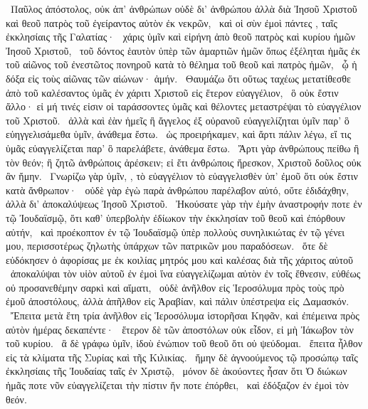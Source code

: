 ~Παῦλος ἀπόστολος, οὐκ ἀπ’ ἀνθρώπων οὐδὲ δι’ ἀνθρώπου ἀλλὰ διὰ Ἰησοῦ Χριστοῦ καὶ θεοῦ πατρὸς τοῦ ἐγείραντος αὐτὸν ἐκ νεκρῶν,
~καὶ οἱ σὺν ἐμοὶ πάντες , ταῖς ἐκκλησίαις τῆς Γαλατίας·
~χάρις ὑμῖν καὶ εἰρήνη ἀπὸ θεοῦ πατρὸς καὶ κυρίου ἡμῶν Ἰησοῦ Χριστοῦ,
~τοῦ δόντος ἑαυτὸν ὑπὲρ τῶν ἁμαρτιῶν ἡμῶν ὅπως ἐξέληται ἡμᾶς ἐκ τοῦ αἰῶνος τοῦ ἐνεστῶτος πονηροῦ κατὰ τὸ θέλημα τοῦ θεοῦ καὶ πατρὸς ἡμῶν,
~ᾧ ἡ δόξα εἰς τοὺς αἰῶνας τῶν αἰώνων· ἀμήν.
~Θαυμάζω ὅτι οὕτως ταχέως μετατίθεσθε ἀπὸ τοῦ καλέσαντος ὑμᾶς ἐν χάριτι Χριστοῦ εἰς ἕτερον εὐαγγέλιον,
~ὃ οὐκ ἔστιν ἄλλο· εἰ μή τινές εἰσιν οἱ ταράσσοντες ὑμᾶς καὶ θέλοντες μεταστρέψαι τὸ εὐαγγέλιον τοῦ Χριστοῦ.
~ἀλλὰ καὶ ἐὰν ἡμεῖς ἢ ἄγγελος ἐξ οὐρανοῦ εὐαγγελίζηται ὑμῖν παρ’ ὃ εὐηγγελισάμεθα ὑμῖν, ἀνάθεμα ἔστω.
~ὡς προειρήκαμεν, καὶ ἄρτι πάλιν λέγω, εἴ τις ὑμᾶς εὐαγγελίζεται παρ’ ὃ παρελάβετε, ἀνάθεμα ἔστω.
~Ἄρτι γὰρ ἀνθρώπους πείθω ἢ τὸν θεόν; ἢ ζητῶ ἀνθρώποις ἀρέσκειν; εἰ ἔτι ἀνθρώποις ἤρεσκον, Χριστοῦ δοῦλος οὐκ ἂν ἤμην.
~Γνωρίζω γὰρ ὑμῖν, , τὸ εὐαγγέλιον τὸ εὐαγγελισθὲν ὑπ’ ἐμοῦ ὅτι οὐκ ἔστιν κατὰ ἄνθρωπον·
~οὐδὲ γὰρ ἐγὼ παρὰ ἀνθρώπου παρέλαβον αὐτό, οὔτε ἐδιδάχθην, ἀλλὰ δι’ ἀποκαλύψεως Ἰησοῦ Χριστοῦ.
~Ἠκούσατε γὰρ τὴν ἐμὴν ἀναστροφήν ποτε ἐν τῷ Ἰουδαϊσμῷ, ὅτι καθ’ ὑπερβολὴν ἐδίωκον τὴν ἐκκλησίαν τοῦ θεοῦ καὶ ἐπόρθουν αὐτήν,
~καὶ προέκοπτον ἐν τῷ Ἰουδαϊσμῷ ὑπὲρ πολλοὺς συνηλικιώτας ἐν τῷ γένει μου, περισσοτέρως ζηλωτὴς ὑπάρχων τῶν πατρικῶν μου παραδόσεων.
~ὅτε δὲ εὐδόκησεν ὁ ἀφορίσας με ἐκ κοιλίας μητρός μου καὶ καλέσας διὰ τῆς χάριτος αὐτοῦ
~ἀποκαλύψαι τὸν υἱὸν αὐτοῦ ἐν ἐμοὶ ἵνα εὐαγγελίζωμαι αὐτὸν ἐν τοῖς ἔθνεσιν, εὐθέως οὐ προσανεθέμην σαρκὶ καὶ αἵματι,
~οὐδὲ ἀνῆλθον εἰς Ἱεροσόλυμα πρὸς τοὺς πρὸ ἐμοῦ ἀποστόλους, ἀλλὰ ἀπῆλθον εἰς Ἀραβίαν, καὶ πάλιν ὑπέστρεψα εἰς Δαμασκόν.
~Ἔπειτα μετὰ ἔτη τρία ἀνῆλθον εἰς Ἱεροσόλυμα ἱστορῆσαι Κηφᾶν, καὶ ἐπέμεινα πρὸς αὐτὸν ἡμέρας δεκαπέντε·
~ἕτερον δὲ τῶν ἀποστόλων οὐκ εἶδον, εἰ μὴ Ἰάκωβον τὸν  τοῦ κυρίου.
~ἃ δὲ γράφω ὑμῖν, ἰδοὺ ἐνώπιον τοῦ θεοῦ ὅτι οὐ ψεύδομαι.
~ἔπειτα ἦλθον εἰς τὰ κλίματα τῆς Συρίας καὶ τῆς Κιλικίας.
~ἤμην δὲ ἀγνοούμενος τῷ προσώπῳ ταῖς ἐκκλησίαις τῆς Ἰουδαίας ταῖς ἐν Χριστῷ,
~μόνον δὲ ἀκούοντες ἦσαν ὅτι Ὁ διώκων ἡμᾶς ποτε νῦν εὐαγγελίζεται τὴν πίστιν ἥν ποτε ἐπόρθει,
~καὶ ἐδόξαζον ἐν ἐμοὶ τὸν θεόν.

